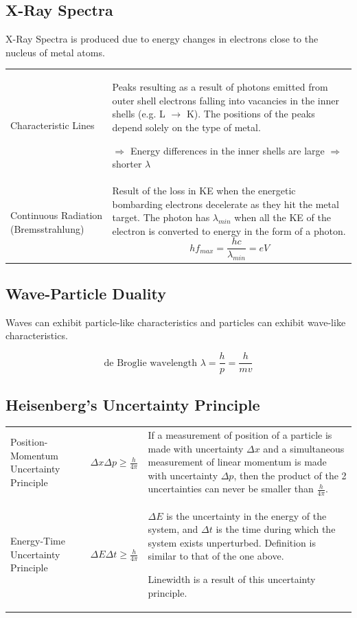 \documentclass[a4paper,11pt]{article}
\begin{document}
		\subsection{X-Ray Spectra}
			X-Ray Spectra is produced due to energy changes in electrons close to the nucleus of metal atoms.
			
			\begin{center}
				\renewcommand{\arraystretch}{1.8}
				\begin{tabular}{@{} p{3.5cm} p{10.5cm} @{}}
					\toprule
					Characteristic Lines & Peaks resulting as a result of photons emitted from outer shell electrons falling into vacancies in the inner shells (e.g. L $\rightarrow$ K). The positions of the peaks depend solely on the type of metal. \par $\Rightarrow$ Energy differences in the inner shells are large $\Rightarrow$ shorter $\lambda$\\
					Continuous Radiation (Bremsstrahlung) & Result of the loss in KE when the energetic bombarding electrons decelerate as they hit the metal target. The photon has $\lambda_{min}$ when all the KE of the electron is converted to energy in the form of a photon. $$hf_{max}=\frac{hc}{\lambda_{min}}=eV$$ \vspace*{-\baselineskip}\\
					\bottomrule
				\end{tabular}
			\end{center}
		\subsection{Wave-Particle Duality}
			Waves can exhibit particle-like characteristics and particles can exhibit wave-like characteristics.
			
			$$\textrm{de Broglie wavelength }\lambda = \frac{h}{p}=\frac{h}{mv}$$
		\subsection{Heisenberg's Uncertainty Principle}
			\begin{center}
				\renewcommand{\arraystretch}{1.8}
				\begin{tabular}{@{} p{3.5cm} l p{8.3cm} @{}}
					\toprule
					Position-Momentum Uncertainty Principle & $\displaystyle \Delta x \Delta p \geq \frac{h}{4\pi}$ & If a measurement of position of a particle is made with uncertainty $\Delta x$ and a simultaneous measurement of linear momentum is made with uncertainty $\Delta p$, then the product of the 2 uncertainties can never be smaller than $\frac{h}{4\pi}$. \\
					Energy-Time Uncertainty Principle & $\Delta E \Delta t \geq \frac{h}{4\pi}$ & $\Delta E$ is the uncertainty in the energy of the system, and $\Delta t$ is the time during which the system exists unperturbed. Definition is similar to that of the one above. \par Linewidth is a result of this uncertainty principle. \\
					\bottomrule
				\end{tabular}
			\end{center}
\end{document}
